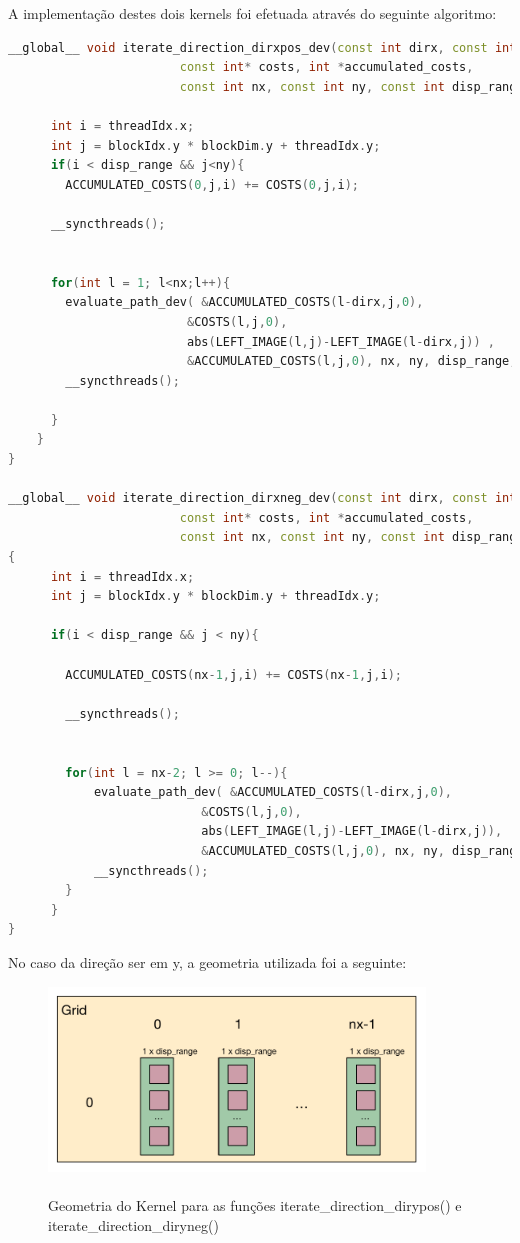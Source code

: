 \documentclass[pdftex,12pt,a4paper]{report}
\begin{document}
A implementação destes dois kernels foi efetuada através do seguinte algoritmo:

 \begin{lstlisting}[language=c++, basicstyle=\scriptsize]
__global__ void iterate_direction_dirxpos_dev(const int dirx, const int *left_image,
                        const int* costs, int *accumulated_costs,
                        const int nx, const int ny, const int disp_range ){

      int i = threadIdx.x;
      int j = blockIdx.y * blockDim.y + threadIdx.y;
      if(i < disp_range && j<ny){
        ACCUMULATED_COSTS(0,j,i) += COSTS(0,j,i);

      __syncthreads();


      for(int l = 1; l<nx;l++){
        evaluate_path_dev( &ACCUMULATED_COSTS(l-dirx,j,0),
                         &COSTS(l,j,0),
                         abs(LEFT_IMAGE(l,j)-LEFT_IMAGE(l-dirx,j)) ,
                         &ACCUMULATED_COSTS(l,j,0), nx, ny, disp_range, i);
        __syncthreads();

      }
    }
}

__global__ void iterate_direction_dirxneg_dev(const int dirx, const int *left_image,
                        const int* costs, int *accumulated_costs,
                        const int nx, const int ny, const int disp_range )
{
      int i = threadIdx.x;
      int j = blockIdx.y * blockDim.y + threadIdx.y;

      if(i < disp_range && j < ny){

        ACCUMULATED_COSTS(nx-1,j,i) += COSTS(nx-1,j,i);

        __syncthreads();


        for(int l = nx-2; l >= 0; l--){
            evaluate_path_dev( &ACCUMULATED_COSTS(l-dirx,j,0),
                           &COSTS(l,j,0),
                           abs(LEFT_IMAGE(l,j)-LEFT_IMAGE(l-dirx,j)),
                           &ACCUMULATED_COSTS(l,j,0), nx, ny, disp_range, i);
            __syncthreads();
        }
      }
}
\end{lstlisting} 

\newpage
No caso da direção ser em y, a geometria utilizada foi a seguinte:

\begin{figure}[!htb]
\center
 \includegraphics[width=100mm,scale=1]{IteratePositionDiryposneg_v2_kernel.pdf}
 \caption{\\ Geometria do Kernel para as funções iterate\_direction\_dirypos() e iterate\_direction\_diryneg()}
 \label{fig:IteratePositionDiryposneg_v2_kernel}
\end{figure}
\end{document}
